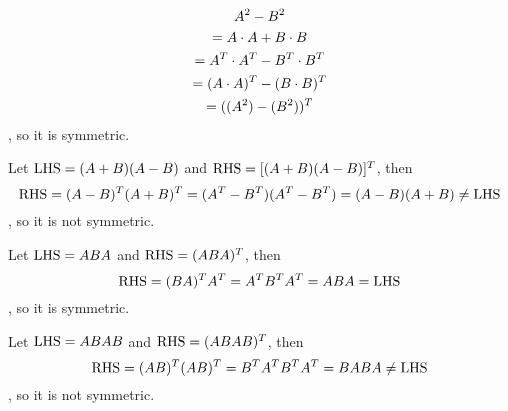 \documentclass[11pt]{homework}
\begin{document}
    \question
    \begin{arabicparts}
        \questionpart
        \begin{multline}
            A^2-B^2\\
            =A\cdot A+B\cdot B\\
            =\tp{A}\cdot\tp{A}-\tp{B}\cdot\tp{B}\\
            =\tp{A\cdot A}-\tp{B\cdot B}\\
            =\tp{(A^2)-(B^2)}
        \end{multline}
        , so it is symmetric.

        \questionpart
        Let $\operatorname*{LHS}=(A+B)(A-B)$ and $\operatorname*{RHS}=[(A+B)(A-B)]^T$, then
        \begin{equation}
            \operatorname*{RHS}
            =(A-B)^T(A+B)^T
            =(A^T-B^T)(A^T-B^T)
            =(A-B)(A+B)
            \neq\operatorname*{LHS}
        \end{equation}
        , so it is not symmetric.
        
        \questionpart
        Let $\operatorname*{LHS}=ABA$ and $\operatorname*{RHS}=(ABA)^T$, then
        \begin{equation}
            \operatorname*{RHS}=(BA)^TA^T=A^TB^TA^T=ABA=\operatorname*{LHS}
        \end{equation}
        , so it is symmetric.

        \questionpart
        Let $\operatorname*{LHS}=ABAB$ and $\operatorname*{RHS}=(ABAB)^T$, then
        \begin{equation}
            \operatorname*{RHS}=(AB)^T(AB)^T=B^TA^TB^TA^T=BABA\neq\operatorname*{LHS}
        \end{equation}  
        , so it is not symmetric.
    \end{arabicparts}
\end{document}
